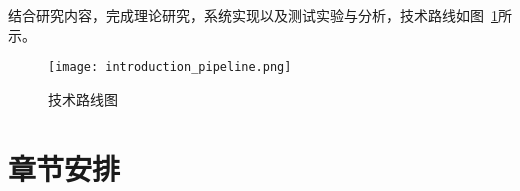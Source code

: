结合研究内容，完成理论研究，系统实现以及测试实验与分析，技术路线如图~\ref{fig:introduction_pipeline}所示。
\begin{figure}[H] %
  \centering
  \texttt{[image: introduction\_pipeline.png]}
  \caption{技术路线图}
  \label{fig:introduction_pipeline}
\end{figure}
\section{章节安排}
\label{sec:1.5}


